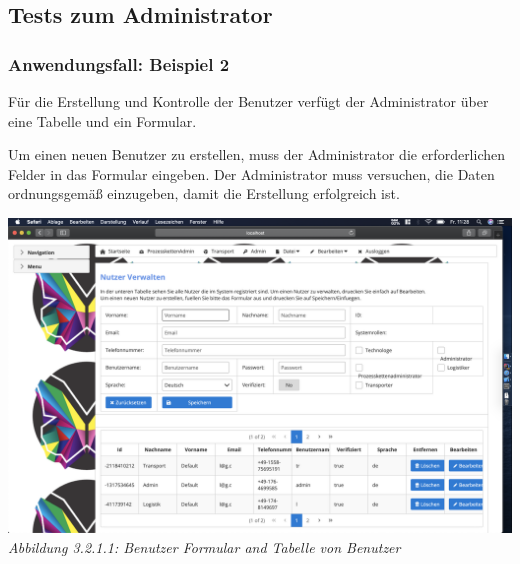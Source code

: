 \documentclass[enabledeprecatedfontcommands,fontsize=12pt,paper=a4,twoside]{scrartcl}
\begin{document}

\subsubsection{}


\subsection{Tests zum Administrator}

\subsubsection{Anwendungsfall: Beispiel 2}
Für die Erstellung und Kontrolle der Benutzer verfügt der Administrator über eine Tabelle und ein Formular.

Um einen neuen Benutzer zu erstellen, muss der Administrator die erforderlichen Felder in das Formular eingeben. Der Administrator muss versuchen, die Daten ordnungsgemäß einzugeben, damit die Erstellung erfolgreich ist.

\hypertarget{sc3.1.2.1}{
\includegraphics[width=1\textwidth]{Screenshots/UserErzeugenFormular.png}
\textit{Abbildung 3.2.1.1: Benutzer Formular and Tabelle von Benutzer}
} \\
\end{document}

